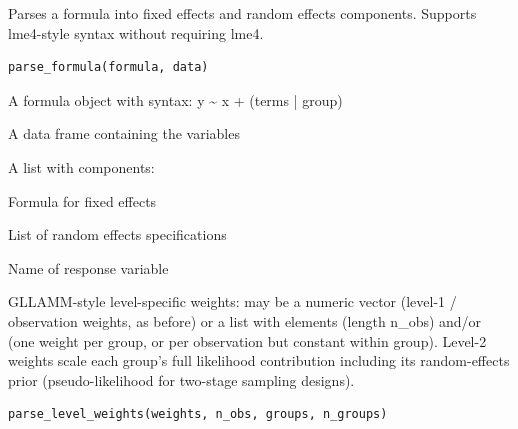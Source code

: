 \documentclass[a4paper]{book}
\begin{document}
%
\begin{Description}
Parses a formula into fixed effects and random effects components.
Supports lme4-style syntax without requiring lme4.
\end{Description}
%
\begin{Usage}
\begin{verbatim}
parse_formula(formula, data)
\end{verbatim}
\end{Usage}
%
\begin{Arguments}
\begin{ldescription}
\item[\code{formula}] A formula object with syntax: y \textasciitilde{} x + (terms | group)

\item[\code{data}] A data frame containing the variables
\end{ldescription}
\end{Arguments}
%
\begin{Value}
A list with components:
\begin{ldescription}
\item[\code{fixed\_formula}] Formula for fixed effects
\item[\code{random\_terms}] List of random effects specifications
\item[\code{response\_name}] Name of response variable
\end{ldescription}
\end{Value}
%
\begin{Description}
GLLAMM-style level-specific weights:  may be a numeric
vector (level-1 / observation weights, as before) or a list with elements
 (length n\_obs) and/or  (one weight per group,
or per observation but constant within group). Level-2 weights scale each
group's full likelihood contribution including its random-effects prior
(pseudo-likelihood for two-stage sampling designs).
\end{Description}
%
\begin{Usage}
\begin{verbatim}
parse_level_weights(weights, n_obs, groups, n_groups)
\end{verbatim}
\end{Usage}
\end{document}
